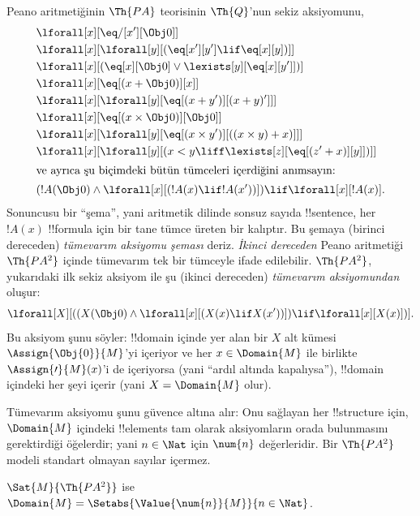 



Peano aritmetiğinin $\Th{PA}$ teorisinin $\Th{Q}$'nun sekiz aksiyomunu,
\begin{align*}
& \lforall[x][\eq/[x'][\Obj 0]]\\
& \lforall[x][\lforall[y][(\eq[x'][y'] \lif \eq[x][y])]]\\
& \lforall[x][(\eq[x][\Obj 0] \lor \lexists[y][\eq[x][y']])]\\ 
& \lforall[x][\eq[(x + \Obj 0)][x]]\\
& \lforall[x][\lforall[y][\eq[(x + y')][(x + y)']]]\\
& \lforall[x][\eq[(x \times \Obj 0)][\Obj 0]]\\
& \lforall[x][\lforall[y][\eq[(x \times y')][((x \times y) + x)]]]\\
& \lforall[x][\lforall[y][(x < y \liff \lexists[z][\eq[(z' + x)][y]])]]\\
\intertext{ve ayrıca şu biçimdeki bütün tümceleri içerdiğini anımsayın:}
& (!A(\Obj 0) \land \lforall[x][(!A(x) \lif !A(x'))]) \lif \lforall[x][!A(x)].
\end{align*}
Sonuncusu bir ``şema'', yani aritmetik dilinde sonsuz sayıda !!{sentence},
her $!A(x)$ !!{formula} için bir tane tümce üreten bir kalıptır. Bu
şemaya (birinci dereceden) \emph{tümevarım aksiyomu şeması} deriz.
\emph{İkinci dereceden} Peano aritmetiği $\Th{PA^2}$ içinde tümevarım tek bir
tümceyle ifade edilebilir. $\Th{PA^2}$, yukarıdaki ilk sekiz aksiyom ile şu
(ikinci dereceden) \emph{tümevarım aksiyomundan} oluşur:
\[
\lforall[X][((X(\Obj 0) \land \lforall[x][(X(x) \lif X(x'))]) \lif \lforall[x][X(x)])].
\]
Bu aksiyom şunu söyler: !!{domain} içinde yer alan bir $X$ alt kümesi
$\Assign{\Obj{0}}{M}$'yi içeriyor ve her $x\in\Domain{M}$ ile birlikte
$\Assign{\prime}{M}(x)$'i de içeriyorsa (yani ``ardıl altında kapalıysa''),
!!{domain} içindeki her şeyi içerir (yani $X=\Domain{M}$ olur).

Tümevarım aksiyomu şunu güvence altına alır: Onu sağlayan her !!{structure}
için, $\Domain{M}$ içindeki !!{element}s tam olarak aksiyomların orada
bulunmasını gerektirdiği öğelerdir; yani $n\in\Nat$ için $\num{n}$
değerleridir. Bir $\Th{PA^2}$ modeli standart olmayan sayılar içermez.

\begin{thm}
$\Sat{M}{\Th{PA^2}}$ ise $\Domain{M} =
\Setabs{\Value{\num{n}}{M}}{n \in \Nat}$.
\end{thm}

